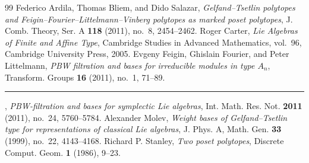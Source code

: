 \documentclass[10pt,a4paper]{article}
\theoremstyle{remark}\newtheorem{rema}[theo]{Remark}
\begin{document}
\begin{thebibliography}{99}
 Federico Ardila, Thomas Bliem, and Dido Salazar,
\emph{Gelfand--Tsetlin polytopes and Feigin--Fourier--Littelmann--Vinberg polytopes as marked poset polytopes},
J. Comb. Theory, Ser. A \textbf{118} (2011), no.~8, 2454--2462.
 Roger Carter, \emph{Lie Algebras of Finite and Affine Type},
Cambridge Studies in Advanced Mathematics, vol.~96, Cambridge University Press, 2005.
 Evgeny Feigin, Ghislain Fourier, and Peter Littelmann,
\emph{PBW filtration and bases for irreducible modules in type $A_n$},
Transform. Groups \textbf{16} (2011), no.~1, 71--89.
 \rule[0.5ex]{2em}{0.4pt},
\emph{PBW-filtration and bases for symplectic Lie algebras},
Int. Math. Res. Not. \textbf{2011} (2011), no.~24, 5760--5784.
 Alexander Molev,
\emph{Weight bases of Gelfand--Tsetlin type for representations of classical Lie algebras},
J. Phys. A, Math. Gen. \textbf{33} (1999), no.~22, 4143--4168.
 Richard P. Stanley, \emph{Two poset polytopes},
Discrete Comput. Geom. \textbf{1} (1986), 9--23.
\end{thebibliography}
\end{document}
